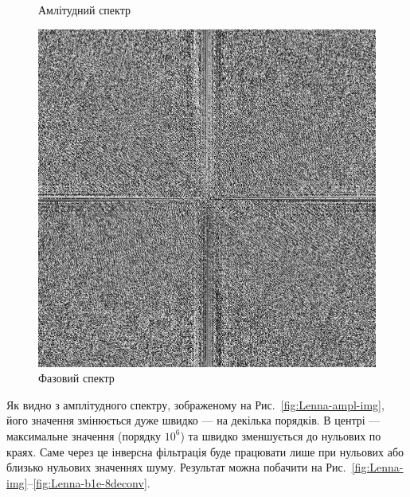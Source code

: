 \documentclass{diploma}
\begin{document}
\begin{figure}[!htb]
          \caption{Амлітудний спектр}\label{fig:Lenna-ampl-img}
        \endminipage\hfill
          \includegraphics[width=\linewidth]{Lenna-phase.png}
          \caption{Фазовий спектр}\label{fig:Lenna-phase-img}
        \endminipage\hfill
      \end{figure}

      Як видно з амплітудного спектру, зображеному на
      Рис.~\ref{fig:Lenna-ampl-img}, його значення змінюється дуже швидко ---
      на декілька порядків.
      В центрі --- максимальне значення (порядку $10^6$) та швидко зменшується
      до нульових по краях.
      Саме через це інверсна фільтрація буде працювати лише при нульових або
      близько нульових значеннях шуму.
      Результат можна побачити на
      Рис.~\ref{fig:Lenna-img}--\ref{fig:Lenna-b1e-8deconv}.
\end{document}
